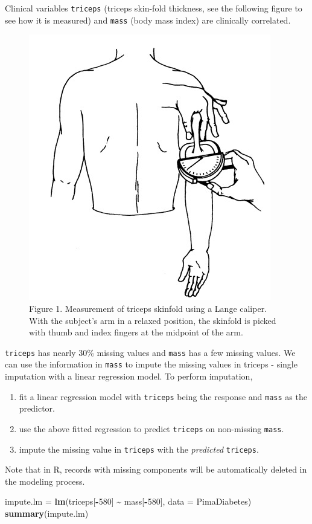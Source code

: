 \documentclass[
]{book}
\newenvironment{Shaded}{\begin{snugshade}}{\end{snugshade}}
\newcommand{\AttributeTok}[1]{\textcolor[rgb]{0.13,0.29,0.53}{#1}}
\newcommand{\DecValTok}[1]{\textcolor[rgb]{0.00,0.00,0.81}{#1}}
\newcommand{\FunctionTok}[1]{\textcolor[rgb]{0.13,0.29,0.53}{\textbf{#1}}}
\newcommand{\NormalTok}[1]{#1}
\newcommand{\OtherTok}[1]{\textcolor[rgb]{0.56,0.35,0.01}{#1}}
\newcommand{\SpecialCharTok}[1]{\textcolor[rgb]{0.81,0.36,0.00}{\textbf{#1}}}
\begin{document}
Clinical variables \texttt{triceps} (triceps skin-fold thickness, see the following figure to see how it is measured) and \texttt{mass} (body mass index) are clinically correlated.

\begin{figure}

{\centering \includegraphics[width=0.3\linewidth]{img03/tricepts} 

}

\caption{Figure 1. Measurement of triceps skinfold using a Lange caliper. With the subject's arm in a relaxed position, the skinfold is picked with thumb and index fingers at the midpoint of the arm.}\label{fig:unnamed-chunk-57}
\end{figure}

\texttt{triceps} has nearly 30\% missing values and \texttt{mass} has a few missing values. We can use the information in \texttt{mass} to impute the missing values in triceps - single imputation with a linear regression model. To perform imputation,

\begin{enumerate}
\def\labelenumi{\arabic{enumi}.}
\item
  fit a linear regression model with \texttt{triceps} being the response and \texttt{mass} as the predictor.
\item
  use the above fitted regression to predict \texttt{triceps} on non-missing \texttt{mass}.
\item
  impute the missing value in \texttt{triceps} with the \emph{predicted} \texttt{triceps}.
\end{enumerate}

Note that in R, records with missing components will be automatically deleted in the modeling process.

\begin{Shaded}
\begin{Highlighting}[]
\NormalTok{impute.lm }\OtherTok{=} \FunctionTok{lm}\NormalTok{(triceps[}\SpecialCharTok{{-}}\DecValTok{580}\NormalTok{] }\SpecialCharTok{\textasciitilde{}}\NormalTok{ mass[}\SpecialCharTok{{-}}\DecValTok{580}\NormalTok{], }\AttributeTok{data =}\NormalTok{ PimaDiabetes)}
\FunctionTok{summary}\NormalTok{(impute.lm)}
\end{Highlighting}
\end{Shaded}
\end{document}

